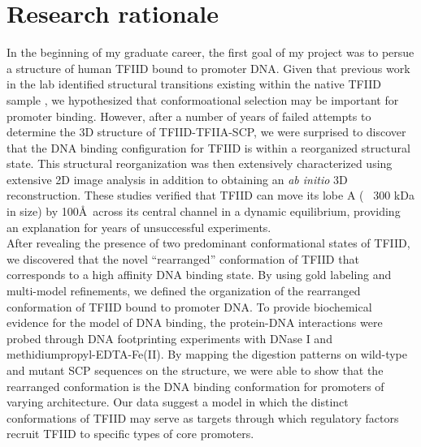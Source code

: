 \section{Research rationale}

In the beginning of my graduate career, the first goal of my project was to persue a structure of human TFIID bound to promoter DNA. Given that previous work in the lab identified structural transitions existing within the native TFIID sample \cite{Grob_1281}, we hypothesized that conformoational selection may be important for promoter binding. However, after a number of years of failed attempts to determine the 3D structure of TFIID-TFIIA-SCP, we were surprised to discover that the DNA binding configuration for TFIID is within a reorganized structural state. This structural reorganization was then extensively characterized using extensive 2D image analysis in addition to obtaining an \emph{ab initio} 3D reconstruction. These studies verified that TFIID can move its lobe A (~ 300 kDa in size) by 100\AA\ across its central channel in a dynamic equilibrium, providing an explanation for years of unsuccessful experiments. \\
\indent After revealing the presence of two predominant conformational states of TFIID, we discovered that the novel “rearranged” conformation of TFIID that corresponds to a high affinity DNA binding state. By using gold labeling and multi-model refinements, we defined the organization of the rearranged conformation of TFIID bound to promoter DNA. To provide biochemical evidence for the model of DNA binding, the protein-DNA interactions were probed through DNA footprinting experiments with DNase I and methidiumpropyl-EDTA-Fe(II). By mapping the digestion patterns on wild-type and mutant SCP sequences on the structure, we were able to show that the rearranged conformation is the DNA binding conformation for promoters of varying architecture. Our data suggest a model in which the distinct conformations of TFIID may serve as targets through which regulatory factors recruit TFIID to specific types of core promoters.\\

